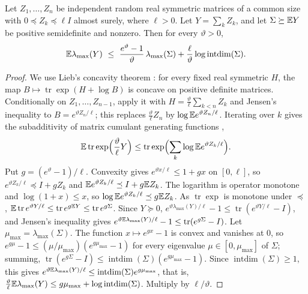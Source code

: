 \begin{proposition}\label{prop:intdim}
Let $Z_1,\ldots,Z_n$ be independent random real symmetric matrices of a
common size with $0\preceq Z_k\preceq\ell I$ almost surely, where $\ell>0$.
Let $Y=\sum_kZ_k$, and let $\Sigma\succeq\mathbb E Y$ be positive semidefinite and
nonzero. Then for every $\vartheta>0$,
\[
 \E\lambda_{\max}(Y)\ \le\ \frac{e^\vartheta-1}\vartheta\,\lambda_{\max}(\Sigma)
 +\frac\ell\vartheta\log\operatorname{intdim}(\Sigma).
\]
\end{proposition}
\begin{proof}
We use Lieb's concavity theorem \cite[Theorem~6]{lieb}: for every fixed
real symmetric $H$, the map $B\mapsto\operatorname{tr}\exp(H+\log B)$ is
concave on positive definite matrices. Conditionally on
$Z_1,\ldots,Z_{n-1}$, apply it with $H=\frac\vartheta\ell\sum_{k<n}Z_k$ and
Jensen's inequality to $B=e^{\vartheta Z_n/\ell}$; this replaces
$\frac\vartheta\ell Z_n$ by $\log\mathbb E e^{\vartheta Z_n/\ell}$.
Iterating over $k$ gives the subadditivity of matrix cumulant generating
functions \cite[Lemma~3.4]{tropp2012},
\[
 \mathbb E\operatorname{tr}\exp\Bigl(\frac\vartheta\ell Y\Bigr)\le
 \operatorname{tr}\exp\Bigl(\sum_k\log\mathbb E e^{\vartheta Z_k/\ell}\Bigr).
\]
Put $g=(e^\vartheta-1)/\ell$. Convexity gives $e^{\vartheta x/\ell}\le1+gx$
on $[0,\ell]$, so $e^{\vartheta Z_k/\ell}\preceq I+gZ_k$ and
$\mathbb E e^{\vartheta Z_k/\ell}\preceq I+g\mathbb E Z_k$. The
logarithm is operator monotone and $\log(1+x)\le x$, so
$\log\mathbb E e^{\vartheta Z_k/\ell}\preceq g\mathbb E Z_k$. As $\operatorname{tr}\exp$ is monotone
under $\preceq$, $\mathbb E\operatorname{tr}e^{\vartheta Y/\ell}\le\operatorname{tr}e^{g\mathbb E Y}
\le\operatorname{tr}e^{g\Sigma}$. Since $Y\succeq0$,
$e^{\vartheta\lambda_{\max}(Y)/\ell}-1\le\operatorname{tr}(e^{\vartheta Y/\ell}-I)$,
and Jensen's inequality gives
$e^{\vartheta\mathbb E\lambda_{\max}(Y)/\ell}-1\le\operatorname{tr}(e^{g\Sigma}-I)$.
Let $\mu_{\max}=\lambda_{\max}(\Sigma)$. The function $x\mapsto e^{gx}-1$ is
convex and vanishes at $0$, so $e^{g\mu}-1\le(\mu/\mu_{\max})(e^{g\mu_{\max}}-1)$
for every eigenvalue $\mu\in[0,\mu_{\max}]$ of $\Sigma$; summing,
$\operatorname{tr}(e^{g\Sigma}-I)\le\operatorname{intdim}(\Sigma)
(e^{g\mu_{\max}}-1)$. Since $\operatorname{intdim}(\Sigma)\ge1$, this gives
$e^{\vartheta\mathbb E\lambda_{\max}(Y)/\ell}\le\operatorname{intdim}(\Sigma)e^{g\mu_{\max}}$,
that is,
$\frac\vartheta\ell\mathbb E\lambda_{\max}(Y)\le g\mu_{\max}+\log\operatorname{intdim}(\Sigma)$.
Multiply by $\ell/\vartheta$.
\end{proof}

